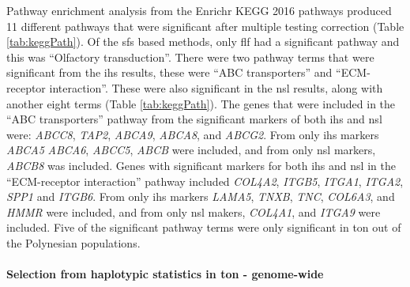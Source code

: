 \documentclass[]{report}
\let\oldparagraph\paragraph
\renewcommand{\paragraph}[1]{\oldparagraph{#1}\mbox{}}
\begin{document}
Pathway enrichment analysis from the Enrichr KEGG 2016 pathways produced
11 different pathways that were significant after multiple testing
correction (Table \ref{tab:keggPath}). Of the \gls{sfs} based methods,
only \gls{flf} had a significant pathway and this was ``Olfactory
transduction''. There were two pathway terms that were significant from
the \gls{ihs} results, these were ``ABC transporters'' and
``ECM-receptor interaction''. These were also significant in the
\gls{nsl} results, along with another eight terms (Table
\ref{tab:keggPath}). The genes that were included in the ``ABC
transporters'' pathway from the significant markers of both \gls{ihs}
and \gls{nsl} were: \emph{ABCC8}, \emph{TAP2}, \emph{ABCA9},
\emph{ABCA8}, and \emph{ABCG2}. From only \gls{ihs} markers \emph{ABCA5}
\emph{ABCA6}, \emph{ABCC5}, \emph{ABCB} were included, and from only
\gls{nsl} markers, \emph{ABCB8} was included. Genes with significant
markers for both \gls{ihs} and \gls{nsl} in the ``ECM-receptor
interaction'' pathway included \emph{COL4A2}, \emph{ITGB5},
\emph{ITGA1}, \emph{ITGA2}, \emph{SPP1} and \emph{ITGB6}. From only
\gls{ihs} markers \emph{LAMA5}, \emph{TNXB}, \emph{TNC}, \emph{COL6A3},
and \emph{HMMR} were included, and from only \gls{nsl} makers,
\emph{COL4A1}, and \emph{ITGA9} were included. Five of the significant
pathway terms were only significant in \gls{ton} out of the Polynesian
populations.

\paragraph{\texorpdfstring{Selection from haplotypic statistics in
\gls{ton} -
genome-wide}{Selection from haplotypic statistics in  - genome-wide}}\label{selection-from-haplotypic-statistics-in---genome-wide-2}
\end{document}
